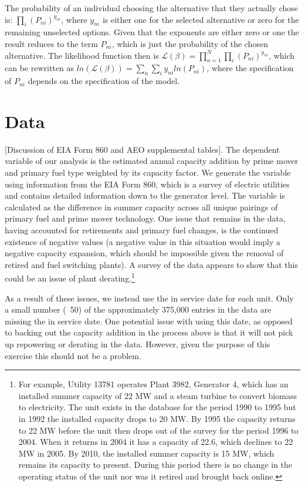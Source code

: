 \documentclass[10pt]{amsart}
\begin{document}
The probability of an individual choosing the alternative that they actually chose is: $\prod_{i} \left(P_{ni}\right)^{y_{ni}}$, where $y_{ni}$ is either one for the selected alternative or zero for the remaining unselected options.
Given that the exponents are either zero or one the result reduces to the term $P_{ni}$, which is just the probability of the chosen alternative. 
The likelihood function then is $\mathcal{L(\beta)} = \prod_{n=1}^N \prod_{i} \left(P_{ni}\right)^{y_{ni}}$, which can be rewritten as $ln(\mathcal{L(\beta)})= \sum_{n} \sum_{i} y_{ni} ln\left(P_{ni}\right)$, where the specification of $P_{ni}$ depends on the specification of the model. 


\section{Data}
[Discussion of EIA Form 860 and AEO supplemental tables].
The dependent variable of our analysis is the estimated annual capacity addition by prime mover and primary fuel type weighted by its capacity factor.
We generate the variable using information from the EIA Form 860, which is a survey of electric utilities and contains detailed information down to the generator level.
The variable is calculated as the difference in summer capacity across all unique pairings of primary fuel and prime mover technology.
One issue that remains in the data, having accounted for retirements and primary fuel changes, is the continued existence of negative values (a negative value in this situation would imply a negative capacity expansion, which should be impossible given the removal of retired and fuel switching plants).
A survey of the data appears to show that this could be an issue of plant derating.\footnote{For example, Utility 13781 operates Plant 3982, Generator 4, which has an installed summer capacity of 22 MW and a steam turbine to convert biomass to electricity. The unit exists in the database for the period 1990 to 1995 but in 1992 the installed capacity drops to 20 MW. By 1995 the capacity returns to 22 MW before the unit then drops out of the survey for the period 1996 to 2004. When it returns in 2004 it has a capacity of 22.6, which declines to 22 MW in 2005. By 2010, the installed summer capacity is 15 MW, which remains its capacity to present. During this period there is no change in the operating status of the unit nor was it retired and brought back online.} 

As a result of these issues, we instead use the in service date for each unit. 
Only a small number (~50) of the approximately 375,000 entries in the data are missing the in service date.
One potential issue with using this date, as opposed to backing out the capacity addition in the process above is that it will not pick up repowering or derating in the data.
However, given the purpose of this exercise this should not be a problem. 
  
\end{document}
